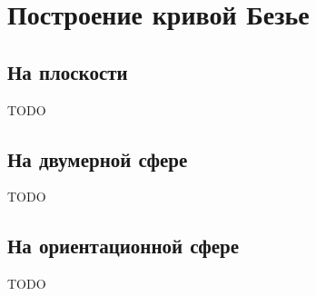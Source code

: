\section{Построение кривой Безье}

\subsection*{На плоскости}

TODO

\subsection*{На двумерной сфере}

TODO

\subsection*{На ориентационной сфере}

TODO
